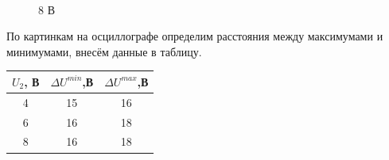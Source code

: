 \documentclass[12pt,a4paper]{article}
\begin{document}
\begin{figure}[H]
\begin{minipage}[h]{0.31\linewidth}
\end{minipage}
\hfill
\begin{minipage}[h]{0.31\linewidth}
 \\ 8 В
\end{minipage}
\end{figure}

По картинкам на осциллографе определим расстояния между максимумами и минимумами, внесём данные в таблицу.
 
\begin{center}
\begin{tabular}{|c|c|c|}
\hline 
$U_2$, В & $\Delta{U}^{min}$,В & $\Delta{U}^{max}$,В \\ 
\hline 
4 & 15 & 16 \\ 
\hline 
6 & 16 & 18 \\ 
\hline 
8 & 16 & 18 \\ 
\hline 
\end{tabular} 
\end{center}
\end{document}
